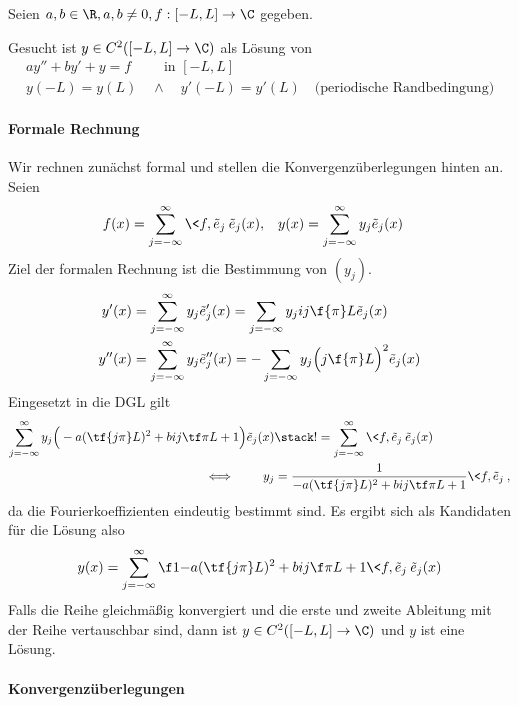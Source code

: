 \begin{ex} \label{3.36}
	Seien $a,b \in \R, a,b \neq 0, f: [-L,L] \to \C$ gegeben.

	Gesucht ist $y \in C^2([-L,L] \to \C)$ als Lösung von
	\begin{gather*}
		ay'' + by' + y = f \qquad \text{ in $[-L,L]$} \\
		y(-L) = y(L) \quad \land \quad y'(-L) = y'(L) \quad \text{(periodische Randbedingung)}
	\end{gather*}


	\paragraph{Formale Rechnung}

	Wir rechnen zunächst formal und stellen die Konvergenzüberlegungen hinten an.
	Seien
	\begin{align*}
		f(x) &= \sum_{j=-\infty}^\infty \<f,\tilde e_j\> \tilde e_j(x), &
		y(x) &= \sum_{j=-\infty}^\infty y_j \tilde e_j(x)
	\end{align*}
	Ziel der formalen Rechnung ist die Bestimmung von $(y_j)$.
	\begin{align*}
		y'(x) &= \sum_{j=-\infty}^\infty y_j \tilde e_j'(x)
			= \sum_{j=-\infty} y_j ij \f {\pi}L \tilde e_j(x) \\
		y''(x) &= \sum_{j=-\infty}^\infty y_j \tilde e_j''(x)
			= -\sum_{j=-\infty} y_j \Big( j \f {\pi}L \Big)^2 \tilde e_j(x)
	\end{align*}
	Eingesetzt in die DGL gilt
	\begin{align*}
		\sum_{j=-\infty}^\infty y_j\Big( -a (\tf {j\pi}L)^2 + b ij \tf \pi L + 1 \Big) \tilde e_j(x)
		&\stack != \sum_{j=-\infty}^\infty \<f, \tilde e_j\> \tilde e_j(x) \\
		\iff \qquad y_j &= \dfrac 1{-a (\tf {j\pi} L)^2 + b ij \tf \pi L + 1} \<f,\tilde e_j\>,
	\end{align*}
	da die Fourierkoeffizienten eindeutig bestimmt sind.
	Es ergibt sich als Kandidaten für die Lösung also
	\[
		y(x) = \sum_{j=-\infty}^\infty \f 1{-a (\tf {j\pi}L )^2 + b ij \f \pi L + 1} \<f, \tilde e_j\> \tilde e_j(x)
	\]
	Falls die Reihe gleichmäßig konvergiert und die erste und zweite Ableitung mit der Reihe vertauschbar sind, dann ist $y \in C^2([-L,L]\to \C)$ und $y$ ist eine Lösung.


	\paragraph{Konvergenzüberlegungen}


\end{ex}
